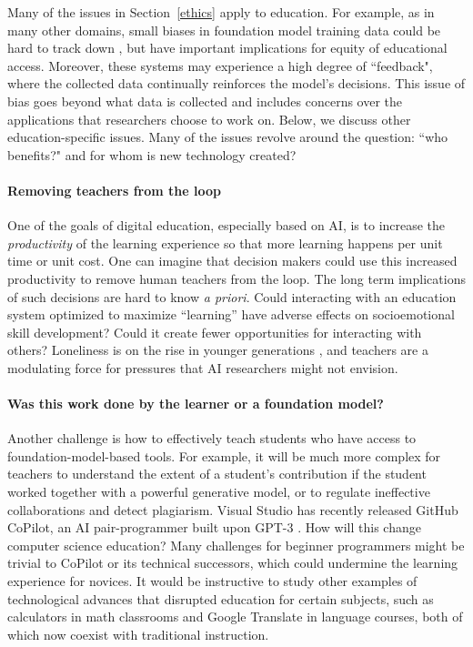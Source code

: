 Many of the issues in Section~\ref{ethics} apply to education. For example, as in many other domains, small biases in foundation model training data could be hard to track down \cite{dixon2018bias, bolukbasi2016}, but have important implications for equity of educational access. Moreover, these systems may experience a high degree of ``feedback", where the collected data continually reinforces the model's decisions. This issue of bias goes beyond what data is collected and includes concerns over the applications that researchers choose to work on. Below, we discuss other education-specific  issues. Many of the issues revolve around the question: ``who benefits?" and for whom is new technology created?

\paragraph{Removing teachers from the loop} One of the goals of digital education, especially based on AI, is to increase the \emph{productivity} of the learning experience so that more learning happens per unit time or unit cost. One can imagine that decision makers could use this increased productivity to remove human teachers from the loop. The long term implications of such decisions are hard to know \emph{a priori}. Could interacting with an education system optimized to maximize ``learning'' have adverse effects on socioemotional skill development? Could it create fewer opportunities for interacting with others? Loneliness is on the rise in younger generations \citep{cigna_2018}, and teachers are a modulating force for pressures that AI researchers might not envision.  

\paragraph{Was this work done by the learner or a foundation model?} Another challenge is how to effectively teach students who have access to foundation-model-based tools. For example, it will be much more complex for teachers to understand the extent of a student's contribution if the student worked together with a powerful generative model, or to regulate ineffective collaborations and detect plagiarism. Visual Studio has recently released GitHub CoPilot, an AI pair-programmer built upon GPT-3 \cite{chen2021evaluating}. How will this change computer science education? Many challenges for beginner programmers might be trivial to CoPilot or its technical successors, which could undermine the learning experience for novices. It would be instructive to study other examples of technological advances that disrupted education for certain subjects, such as calculators in math classrooms and Google Translate in language courses, both of which now coexist with traditional instruction.


